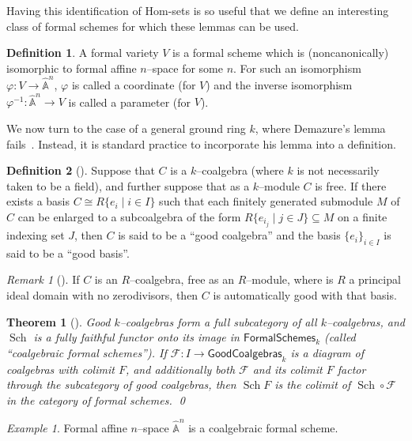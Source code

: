 \documentclass{amsart}
\newcommand{\A}{\widehat{\mathbb{A}}}
\newcommand{\<}{\langle}
\renewcommand{\>}{\rangle}
\renewcommand{\phi}{\varphi}
\newcommand{\CatOf}[1]{\mathsf{#1}}
\newcommand{\sheaf}[1]{\mathcal{#1}}
\DeclareMathOperator{\Sch}{Sch}
\theoremstyle{plain}
\newtheorem*{theorem}{Theorem}
\theoremstyle{definition}
\newtheorem*{definition}{Definition}
\theoremstyle{remark}
\newtheorem*{remark}{Remark}
\newtheorem*{example}{Example}
\begin{document}
\noindent Having this identification of Hom-sets is so useful that we define an interesting class of formal schemes for which these lemmas can be used.
\begin{definition}
A formal variety $V$ is a formal scheme which is (noncanonically) isomorphic to formal affine $n$--space for some $n$.  For such an isomorphism $\phi: V \to \A^n$, $\phi$ is called a coordinate (for $V$) and the inverse isomorphism $\phi^{-1}: \A^n \to V$ is called a parameter (for $V$).
\end{definition}

We now turn to the case of a general ground ring $k$, where Demazure's lemma fails~\cite[Appendix 5.3]{Michaelis}.  Instead, it is standard practice to incorporate his lemma into a definition.
\begin{definition}[{\cite[Definition 4.58]{StricklandFSFG}}]\label{DefnCoalgebraicScheme}
Suppose that $C$ is a $k$--coalgebra (where $k$ is not necessarily taken to be a field), and further suppose that as a $k$--module $C$ is free.  If there exists a basis $C \cong R\{e_i \mid i \in I\}$ such that each finitely generated submodule $M$ of $C$ can be enlarged to a subcoalgebra of the form $R\{e_{i_j} \mid j \in J\} \subseteq M$ on a finite indexing set $J$, then $C$ is said to be a ``good coalgebra'' and the basis $\{e_i\}_{i \in I}$ is said to be a ``good basis''.
\end{definition}

\begin{remark}[{\cite[Appendix 5.3]{Michaelis}}]
If $C$ is an $R$--coalgebra, free as an $R$--module, where is $R$ a principal ideal domain with no zerodivisors, then $C$ is automatically good with that basis.
\end{remark}

\begin{theorem}[{\cite[Proposition 4.64]{StricklandFSFG}}]
Good $k$--coalgebras form a full subcategory of all $k$--coalgebras, and $\Sch$ is a fully faithful functor onto its image in $\CatOf{FormalSchemes}_k$ (called ``coalgebraic formal schemes'').  If $\sheaf{F}: I \to \CatOf{GoodCoalgebras}_k$ is a diagram of coalgebras with colimit $F$, and additionally both $\sheaf{F}$ and its colimit $F$ factor through the subcategory of good coalgebras, then $\Sch F$ is the colimit of $\Sch \circ \sheaf{F}$ in the category of formal schemes. \qed
\end{theorem}

\begin{example}\label{FormalAffineSpaceEx}
Formal affine $n$--space $\A^n$ is a coalgebraic formal scheme.
\end{example}
\end{document}
